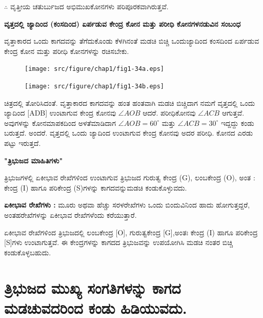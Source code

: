  $\therefore$ ವೃತ್ತೀಯ ಚತುರ್ಬುಜದ ಅಭಿಮುಖಕೋನಗಳು ಪರಿಪೂರಕವಾಗಿರುತ್ತವೆ. 
  
 \noindent
 \textbf{ವೃತ್ತದಲ್ಲಿ ಜ್ಯಾದಿಂದ (ಕಂಸದಿಂದ) ಏರ್ಪಡುವ ಕೇಂದ್ರ ಕೋನ ಮತ್ತು ಪರೀಧಿ ಕೋನಗಳ\break ನಡುವಿನ ಸಂಬಂಧ}
 
ವೃತ್ತಾಕಾರದ ಒಂದು ಕಾಗದವನ್ನು ತೆಗೆದುಕೊಂಡು ಕೆಳಗಿನಂತೆ ಮಡಚಿ ಬಿಚ್ಚಿ ಒಂದು\break ಜ್ಯಾದಿಂದ ಕಂಸದಿಂದ ಏರ್ಪಡುವ ಕೇಂದ್ರ ಕೋನ ಮತ್ತು ಪರೀಧಿ ಕೋನಗಳನ್ನು ರಚಿಸ\break ಬೇಕು. 
\begin{figure}[H]
\centering
\texttt{[image: src/figure/chap1/fig1-34a.eps]}
\end{figure}
    \begin{figure}[H]
\centering
\texttt{[image: src/figure/chap1/fig1-34b.eps]}
\end{figure}
 
 ಚಿತ್ರದಲ್ಲಿ ತೋರಿಸಿದಂತೆ. ವೃತ್ತಾಕಾರದ ಕಾಗದವನ್ನು ಹಂತ ಹಂತವಾಗಿ ಮಡಚಿ ಬಿಚ್ಚಿ\break ದಾಗ ನಮಗೆ ವೃತ್ತದಲ್ಲಿ ಒಂದು ಜ್ಯಾದಿಂದ [ADB] ಉಂಟಾಗುವ ಕೇಂದ್ರ ಕೋನವು $\angle AOB$  ಆದರೆ. ಪರೀಧಿಕೋನವು $\angle ACB$ ಆಗುತ್ತವೆ. ಅವುಗಳನ್ನು ಕೋನಮಾಪಕದಿಂದ ಅಳತೆಮಾಡಿದಾಗ $\angle AOB = 60^\circ$ ಮತ್ತು $\angle ACB = 30^\circ$ ಇದ್ದದ್ದು ಕಂಡು ಬರುತ್ತದೆ. ಅಂದರೆ. ವೃತ್ತದಲ್ಲಿ ಒಂದು ಜ್ಯಾದಿಂದ ಉಂಟಾಗುವ ಕೇಂದ್ರ ಕೋನವು ಅದರ ಪರೀಧಿ. ಕೋನದ ಎರಡು ಪಟ್ಟು ಇರುತ್ತದೆ. 
 
 \smallskip
 \noindent
  \textbf{"ತ್ರಿಭುಜದ ಮಾಹಿತಿಗಳು"}
  
  ತ್ರಿಭುಜಗಳಲ್ಲಿ ಏಕೀಭಾವ ರೇಖೆಗಳಿಂದ ಉಂಟಾಗುವ ತ್ರಿಭುಜದ ಗುರುತ್ವ ಕೇಂದ್ರ (G), ಲಂಬಕೇಂದ್ರ  (O), ಅಂತ : ಕೇಂದ್ರ (I) ಹಾಗೂ  ಪರಿಕೇಂದ್ರ (S)ಗಳನ್ನು ಕಾಗದವನ್ನು\break ಮಡಚಿ ಕಂಡುಕೊಳ್ಳುವದು. 
  
  \noindent
    \textbf{ಏಕೀಭಾವ ರೇಖೆಗಳು :} ಮೂರು ಅಥವಾ ಹೆಚ್ಚು ಸರಳರೇಖೆಗಳು ಒಂದು ಬಿಂದುವಿನಿಂದ ಹಾದು ಹೋಗುತ್ತದ್ದರೆ, ಅಂತಹರೇಖೆಗಳನ್ನು ಏಕೀಭಾವ ರೇಖೆಗಳೆಂದು ಕರೆಯುತ್ತಾರೆ. 
    
    ಏಕೀಭಾವ ರೇಖೆಗಳಿಂದ ತ್ರಿಭುಜದಲ್ಲಿ ಲಂಬಕೇಂದ್ರ [O], ಗುರುತ್ವಕೇಂದ್ರ  [G],\break ಅಂತಃ ಕೇಂದ್ರ  (I) ಹಾಗೂ ಪರಿಕೇಂದ್ರ [S]ಗಳು ಉಂಟಾಗುತ್ತವೆ. ಈ ಕೇಂದ್ರಗಳನ್ನು ಕಾಗದದ ತ್ರಿಭುಜವನ್ನು ಉಪಯೋಗಿಸಿ ಮಡಚಿ ನಂತರ ಬಿಚ್ಚಿ ಕಂಡುಕೊಳ್ಳಬಹುದು. 

\section{ತ್ರಿಭುಜದ ಮುಖ್ಯ ಸಂಗತಿಗಳನ್ನು ಕಾಗದ ಮಡಚುವದರಿಂದ ಕಂಡು ಹಿಡಿಯುವದು. }\label{sec1.13}%
      
